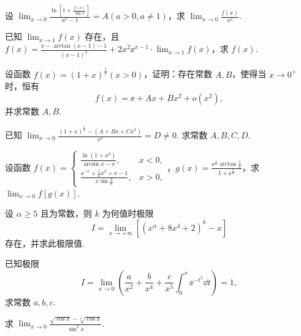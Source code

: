 	\begin{ti}
		设 $\lim_{x \to 0} \frac{\ln\left[ 1 + \frac{f(x)}{\sin x} \right]}{a^{x} - 1} = A (a > 0, a \ne 1)$，求 $\lim_{x \to 0}\frac{f(x)}{x^{2}}$.
	\end{ti}

	\begin{ti}
		已知 $\lim_{x \to 1} f(x)$ 存在，且 $f(x) = \frac{x - \arctan(x - 1) - 1}{(x - 1)^{3}} + 2x^{2} \ee^{x-1} \cdot \lim_{x \to 1} f(x)$，求 $f(x)$.
	\end{ti}

	\begin{ti}
		设函数 $f(x) = (1 + x)^{\frac{1}{x}}(x > 0)$，证明：存在常数 $A,B$，使得当 $x \to 0^{+}$ 时，恒有
		\begin{equation*}
			f(x) = \ee + Ax +Bx^{2} + o\left( x^{2} \right),
		\end{equation*}
		并求常数 $A,B$.
	\end{ti}

	\begin{ti}
		已知 $\lim_{x \to 0} \frac{(1+x)^{\frac{1}{x}} - \left( A + Bx + Cx^{2} \right)}{x^{3}} = D \ne 0$. 求常数 $A,B,C,D$.
	\end{ti}

	\begin{ti}
		设函数 $f(x) = \begin{cases}
			\frac{\ln\left( 1 + x^{3} \right)}{\arcsin x - x}, & x < 0,\\
			\frac{\ee^{-x} + \frac{1}{2}x^{2} + x - 1}{x \sin \frac{x}{6}}, & x > 0,
		\end{cases}$，$g(x) = \frac{\ee^{\frac{1}{x}}\arctan\frac{1}{x}}{1 + \ee^{\frac{2}{x}}}$，求 $\lim_{x \to 0} f[g(x)]$.
	\end{ti}

	\begin{ti}
		设 $\alpha \geq 5$ 且为常数，则 $k$ 为何值时极限
		\begin{equation*}
			I = \lim_{x \to +\infty} \left[ \left( x^{\alpha} + 8x^{4} + 2 \right)^{k} - x \right]
		\end{equation*}
		存在，并求此极限值.
	\end{ti}
	
	\begin{ti}
		已知极限
		\[
			I = \lim_{x \to 0} \left( \frac{a}{x^{2}} + \frac{b}{x^{4}} + \frac{c}{x^{5}} \int_{0}^{x} \ee^{-t^{2}} \dd{t} \right) = 1,
		\]
		求常数 $a,b,c$.
	\end{ti}

	\begin{ti}
		求 $\lim_{x \to 0} \frac{ \sqrt{\cos x} - \sqrt[3]{\cos x} }{\sin^{2}x}$.
	\end{ti}

